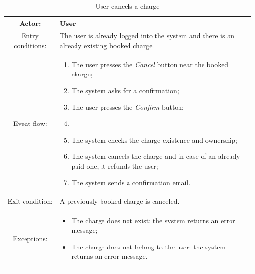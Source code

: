 \begin{table}[h]
    \begin{center}
        \begin{tabular}{|c||p{10cm}|}
            \hline
            Actor:            & User                                                                                       \\
            \hline
            Entry conditions: & The user is already logged into the system and there is an already existing booked charge. \\
            \hline
            Event flow:       &
            \begin{enumerate}
                \item The user presses the \textit{Cancel} button near the booked charge;
                \item The system asks for a confirmation;
                \item The user presses the \textit{Confirm} button;
                \item \item The system checks the charge existence and ownership;
                \item The system cancels the charge and in case of an already paid one, it refunds the user;
                \item The system sends a confirmation email.
            \end{enumerate}
            \\
            \hline
            Exit condition:   & A previously booked charge is canceled.                                                    \\
            \hline
            Exceptions:       &
            \begin{itemize}
                \item The charge does not exist: the system returns an error message;
                \item The charge does not belong to the user: the system returns an error message.
            \end{itemize}
            \\
            \hline
        \end{tabular}
    \end{center}
    \caption{User cancels a charge}
\end{table}

